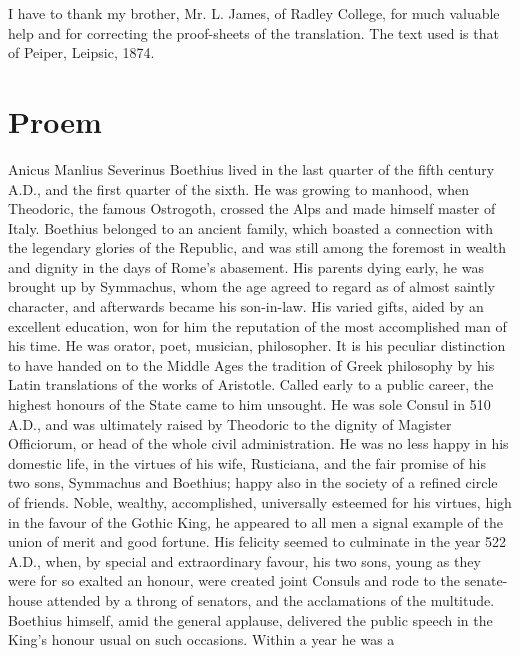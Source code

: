 \documentclass[12pt]{book}
\begin{document}
I have to thank my brother, Mr. L. James, of Radley College, for much
valuable help and for correcting the proof-sheets of the translation.
The text used is that of Peiper, Leipsic, 1874.

\hspace{0pt}
\vfill


\chapter{Proem}

Anicus Manlius Severinus Boethius lived in the last quarter of the fifth
century A.D., and the first quarter of the sixth. He was growing to
manhood, when Theodoric, the famous Ostrogoth, crossed the Alps and made
himself master of Italy. Boethius belonged to an ancient family, which
boasted a connection with the legendary glories of the Republic, and was
still among the foremost in wealth and dignity in the days of Rome's
abasement. His parents dying early, he was brought up by Symmachus, whom
the age agreed to regard as of almost saintly character, and afterwards
became his son-in-law. His varied gifts, aided by an excellent
education, won for him the reputation of the most accomplished man of
his time. He was orator, poet, musician, philosopher. It is his peculiar
distinction to have handed on to the Middle Ages the tradition of Greek
philosophy by his Latin translations of the works of Aristotle. Called
early to a public career, the highest honours of the State came to him
unsought. He was sole Consul in 510 A.D., and was ultimately raised by
Theodoric to the dignity of Magister Officiorum, or head of the whole
civil administration. He was no less happy in his domestic life, in the
virtues of his wife, Rusticiana, and the fair promise of his two sons,
Symmachus and Boethius; happy also in the society of a refined circle of
friends. Noble, wealthy, accomplished, universally esteemed for his
virtues, high in the favour of the Gothic King, he appeared to all men a
signal example of the union of merit and good fortune. His felicity
seemed to culminate in the year 522 A.D., when, by special and
extraordinary favour, his two sons, young as they were for so exalted an
honour, were created joint Consuls and rode to the senate-house
attended by a throng of senators, and the acclamations of the multitude.
Boethius himself, amid the general applause, delivered the public speech
in the King's honour usual on such occasions. Within a year he was a
\end{document}
